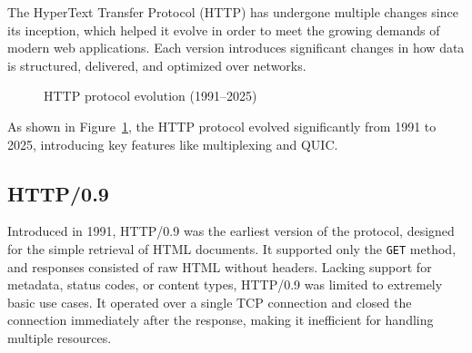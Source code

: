The HyperText Transfer Protocol (HTTP) has undergone multiple changes since its inception, which helped it evolve in order to meet the growing demands of modern web applications. Each version introduces significant changes in how data is structured, delivered, and optimized over networks.
\begin{figure}
\centering
{}
\caption{HTTP protocol evolution (1991--2025)}
\label{fig:http-timeline}
\end{figure}


As shown in Figure~\ref{fig:http-timeline}, the HTTP protocol evolved significantly from 1991 to 2025, introducing key features like multiplexing and QUIC.

\subsection{HTTP/0.9}

Introduced in 1991, HTTP/0.9 was the earliest version of the protocol, designed for the simple retrieval of HTML documents. It supported only the \texttt{GET} method, and responses consisted of raw HTML without headers. Lacking support for metadata, status codes, or content types, HTTP/0.9 was limited to extremely basic use cases. It operated over a single TCP connection and closed the connection immediately after the response, making it inefficient for handling multiple resources.

